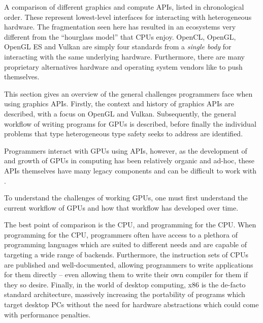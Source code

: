 \documentclass[a4paper,12pt,twoside,openright]{report}
\begin{document}
\begin{table}
\caption{ A comparison of different graphics and compute APIs, listed in
chronological order. These represent lowest-level interfaces for interacting
with heterogeneous hardware. The fragmentation seen here has resulted in an
ecosystems very different from the ``hourglass model'' that CPUs enjoy. OpenCL,
OpenGL, OpenGL ES and Vulkan are simply four standards from a \textit{single
body} for interacting with the same underlying hardware. Furthermore, there are
many proprietary alternatives hardware and operating system vendors like to
push themselves.}


\label{tbl:api_comparison}

\end{table}


This section gives an overview of the general challenges programmers face when
using graphics APIs. Firstly, the context and history of graphics APIs are
described, with a focus on OpenGL and Vulkan. Subsequently, the general
workflow of writing programs for GPUs is described, before finally the
individual problems that type heterogeneous type safety seeks to address are
identified.

Programmers interact with GPUs using APIs, however, as the development of and
growth of GPUs in computing has been relatively organic and ad-hoc, these APIs
themselves have many legacy components and can be difficult to work with
\cite{NVIDIAInternshipLessons}.


To understand the challenges of working GPUs, one must first understand the
current workflow of GPUs and how that workflow has developed over time.

The best point of comparison is the CPU, and programming for the CPU. When
programming for the CPU, programmers often have access to a plethora of
programming languages which are suited to different needs and are capable of
targeting a wide range of backends. Furthermore, the instruction sets of CPUs
are published and well-documented, allowing programmers to write applications
for them directly -- even allowing them to write their own compiler for them
if they so desire. Finally, in the world of desktop computing, x86 is the
de-facto standard architecture, massively increasing the portability of
programs which target desktop PCs without the need for hardware abstractions
which could come with performance penalties.
\end{document}
